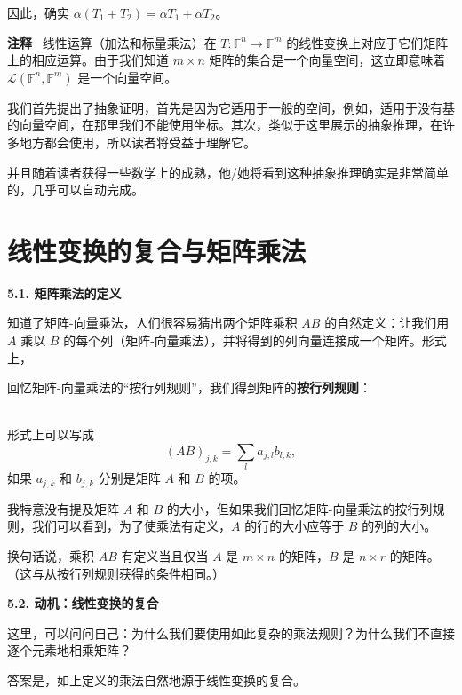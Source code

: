 因此，确实 $\alpha (T_1 + T_2) = \alpha T_1 + \alpha T_2$。

\textbf{注释}~ 线性运算（加法和标量乘法）在 $T: \mathbb{F}^n \to \mathbb{F}^m$ 的线性变换上对应于它们矩阵上的相应运算。由于我们知道 $m \times n$ 矩阵的集合是一个向量空间，这立即意味着 $\mathcal{L}(\mathbb{F}^n, \mathbb{F}^m)$ 是一个向量空间。

我们首先提出了抽象证明，首先是因为它适用于一般的空间，例如，适用于没有基的向量空间，在那里我们不能使用坐标。其次，类似于这里展示的抽象推理，在许多地方都会使用，所以读者将受益于理解它。

并且随着读者获得一些数学上的成熟，他/她将看到这种抽象推理确实是非常简单的，几乎可以自动完成。



\section{线性变换的复合与矩阵乘法}

\textbf{5.1. 矩阵乘法的定义}

知道了矩阵-向量乘法，人们很容易猜出两个矩阵乘积 $AB$ 的自然定义：让我们用 $A$ 乘以 $B$ 的每个列（矩阵-向量乘法），并将得到的列向量连接成一个矩阵。形式上，


回忆矩阵-向量乘法的“按行列规则”，我们得到矩阵的\textbf{按行列规则}：


\\
形式上可以写成 
$$(AB)_{j,k} = \sum_{l} a_{j,l} b_{l,k},$$
如果 $a_{j,k}$ 和 $b_{j,k}$ 分别是矩阵 $A$ 和 $B$ 的项。

我特意没有提及矩阵 $A$ 和 $B$ 的大小，但如果我们回忆矩阵-向量乘法的按行列规则，我们可以看到，为了使乘法有定义，$A$ 的行的大小应等于 $B$ 的列的大小。

换句话说，乘积 $AB$ 有定义当且仅当 $A$ 是 $m \times n$ 的矩阵，$B$ 是 $n \times r$ 的矩阵。（这与从按行列规则获得的条件相同。）

\textbf{5.2. 动机：线性变换的复合}

这里，可以问问自己：为什么我们要使用如此复杂的乘法规则？为什么我们不直接逐个元素地相乘矩阵？

答案是，如上定义的乘法自然地源于线性变换的复合。

